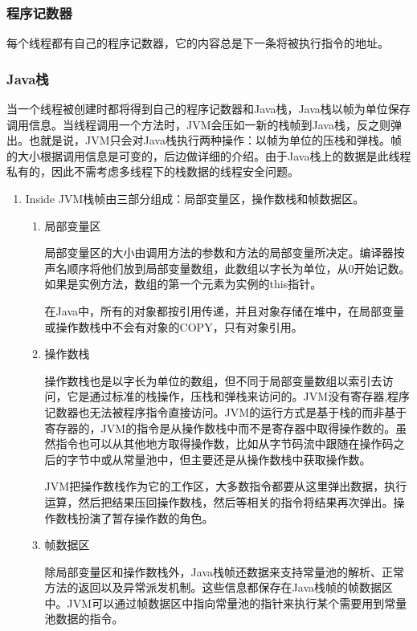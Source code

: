 \documentclass[10pt,b5paper]{article}
\begin{document}
\subsubsection{程序记数器}
\label{sec-3-1-3}

每个线程都有自己的程序记数器，它的内容总是下一条将被执行指令的地址。
\subsubsection{Java栈}
\label{sec-3-1-4}

当一个线程被创建时都将得到自己的程序记数器和Java栈，Java栈以帧为单位保存调用信息。当线程调用一个方法时，JVM会压如一新的栈帧到Java栈，反之则弹出。也就是说，JVM只会对Java栈执行两种操作：以帧为单位的压栈和弹栈。帧的大小根据调用信息是可变的，后边做详细的介绍。由于Java栈上的数据是此线程私有的，因此不需考虑多线程下的栈数据的线程安全问题。

\begin{enumerate}
\item Inside JVM栈帧由三部分组成：局部变量区，操作数栈和帧数据区。
\label{sec-3-1-4-1}

\begin{enumerate}
\item 局部变量区
\label{sec-3-1-4-1-1}

局部变量区的大小由调用方法的参数和方法的局部变量所决定。编译器按声名顺序将他们放到局部变量数组，此数组以字长为单位，从0开始记数。如果是实例方法，数组的第一个元素为实例的this指针。

在Java中，所有的对象都按引用传递，并且对象存储在堆中，在局部变量或操作数栈中不会有对象的COPY，只有对象引用。
\item 操作数栈
\label{sec-3-1-4-1-2}

操作数栈也是以字长为单位的数组，但不同于局部变量数组以索引去访问，它是通过标准的栈操作，压栈和弹栈来访问的。JVM没有寄存器,程序记数器也无法被程序指令直接访问。JVM的运行方式是基于栈的而非基于寄存器的，JVM的指令是从操作数栈中而不是寄存器中取得操作数的。虽然指令也可以从其他地方取得操作数，比如从字节码流中跟随在操作码之后的字节中或从常量池中，但主要还是从操作数栈中获取操作数。

JVM把操作数栈作为它的工作区，大多数指令都要从这里弹出数据，执行运算，然后把结果压回操作数栈，然后等相关的指令将结果再次弹出。操作数栈扮演了暂存操作数的角色。
\item 帧数据区
\label{sec-3-1-4-1-3}

除局部变量区和操作数栈外，Java栈帧还数据来支持常量池的解析、正常方法的返回以及异常派发机制。这些信息都保存在Java栈帧的帧数据区中。JVM可以通过帧数据区中指向常量池的指针来执行某个需要用到常量池数据的指令。
\end{enumerate}
\end{enumerate}
\end{document}
